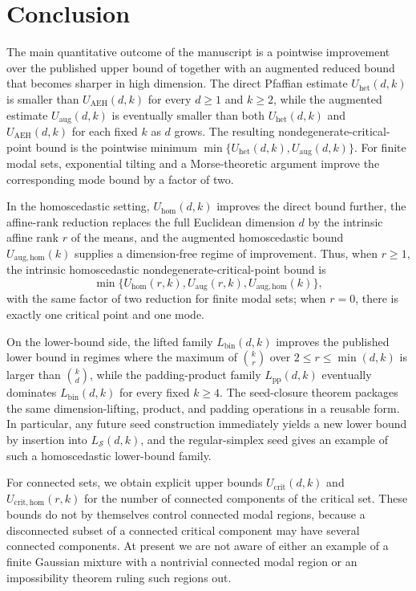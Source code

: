 \documentclass[11pt]{article}
\theoremstyle{plain}
\theoremstyle{definition}
\theoremstyle{remark}
\numberwithin{equation}{section}
\begin{document}
\section{Conclusion}\label{sec:discussion}

The main quantitative outcome of the manuscript is a pointwise improvement over the published upper bound of \citet{AmendolaEngstromHaase2019} together with an augmented reduced bound that becomes sharper in high dimension. The direct Pfaffian estimate $U_{\mathrm{het}}(d,k)$ is smaller than $U_{\mathrm{AEH}}(d,k)$ for every $d\ge 1$ and $k\ge 2$, while the augmented estimate $U_{\mathrm{aug}}(d,k)$ is eventually smaller than both $U_{\mathrm{het}}(d,k)$ and $U_{\mathrm{AEH}}(d,k)$ for each fixed $k$ as $d$ grows. The resulting nondegenerate-critical-point bound is the pointwise minimum $\min\{U_{\mathrm{het}}(d,k),U_{\mathrm{aug}}(d,k)\}$. For finite modal sets, exponential tilting and a Morse-theoretic argument improve the corresponding mode bound by a factor of two.

In the homoscedastic setting, $U_{\mathrm{hom}}(d,k)$ improves the direct bound further, the affine-rank reduction replaces the full Euclidean dimension $d$ by the intrinsic affine rank $r$ of the means, and the augmented homoscedastic bound $U_{\mathrm{aug,hom}}(k)$ supplies a dimension-free regime of improvement. Thus, when $r\ge1$, the intrinsic homoscedastic nondegenerate-critical-point bound is
\[
\min\{U_{\mathrm{hom}}(r,k),U_{\mathrm{aug}}(r,k),U_{\mathrm{aug,hom}}(k)\},
\]
with the same factor of two reduction for finite modal sets; when $r=0$, there is exactly one critical point and one mode.

On the lower-bound side, the lifted family $L_{\mathrm{bin}}(d,k)$ improves the published lower bound in regimes where the maximum of $\binom{k}{r}$ over $2\le r\le \min(d,k)$ is larger than $\binom{k}{d}$, while the padding-product family $L_{\mathrm{pp}}(d,k)$ eventually dominates $L_{\mathrm{bin}}(d,k)$ for every fixed $k\ge 4$. The seed-closure theorem packages the same dimension-lifting, product, and padding operations in a reusable form. In particular, any future seed construction immediately yields a new lower bound by insertion into $L_{\mathcal S}(d,k)$, and the regular-simplex seed gives an example of such a homoscedastic lower-bound family.

For connected sets, we obtain explicit upper bounds $U_{\mathrm{crit}}(d,k)$ and $U_{\mathrm{crit,hom}}(r,k)$ for the number of connected components of the critical set. These bounds do not by themselves control connected modal regions, because a disconnected subset of a connected critical component may have several connected components. At present we are not aware of either an example of a finite Gaussian mixture with a nontrivial connected modal region or an impossibility theorem ruling such regions out.
\end{document}
